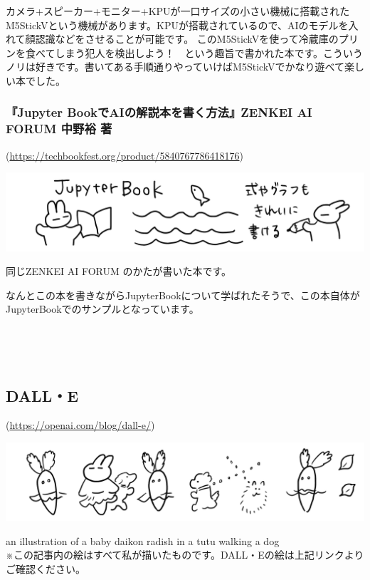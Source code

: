 \documentclass[dvipdfmx,autodetect-engine,10pt,b5paper,papersize,openany,dvipsnames]{jsbook}
\begin{document}
\begin{multicols}{2}
カメラ+スピーカー+モニター+KPUが一口サイズの小さい機械に搭載されたM5StickVという機械があります。KPUが搭載されているので、AIのモデルを入れて顔認識などをさせることが可能です。
このM5StickVを使って冷蔵庫のプリンを食べてしまう犯人を検出しよう！　という趣旨で書かれた本です。こういうノリは好きです。書いてある手順通りやっていけばM5StickVでかなり遊べて楽しい本でした。
\end{multicols}


 
\subsubsection*{『Jupyter BookでAIの解説本を書く方法』ZENKEI AI FORUM 中野裕 著}
(\url{https://techbookfest.org/product/5840767786418176})

\includegraphics[width=\textwidth]{images/202101/newsletter202102_3.png}


\begin{multicols}{2}
同じZENKEI AI FORUM のかたが書いた本です。

なんとこの本を書きながらJupyterBookについて学ばれたそうで、この本自体がJupyterBookでのサンプルとなっています。


\end{multicols}


\subsection*{DALL・E}
(\url{https://openai.com/blog/dall-e/})

\includegraphics[width=\textwidth]{images/202101/newsletter202102_4.png}
\begin{center}
an illustration of a baby daikon radish in a tutu walking a dog\\
※この記事内の絵はすべて私が描いたものです。DALL・Eの絵は上記リンクよりご確認ください。
\end{center}
\end{document}
